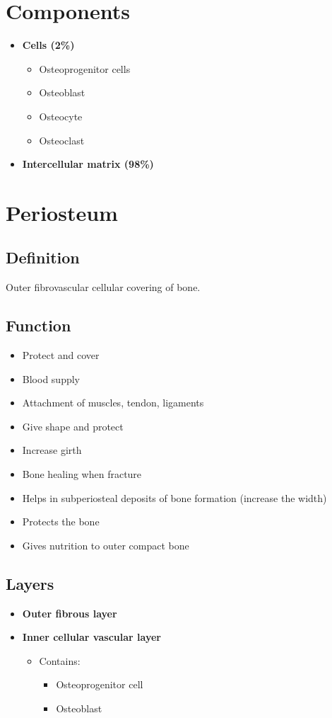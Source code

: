 \documentclass[11pt]{article}
\begin{document}
\section{Components}
\begin{itemize}
    \item \textbf{Cells (2\%)}
    \begin{itemize}
        \item Osteoprogenitor cells
        \item Osteoblast
        \item Osteocyte
        \item Osteoclast
    \end{itemize}
    \item \textbf{Intercellular matrix (98\%)}
\end{itemize}

\section{Periosteum}
\subsection{Definition}
Outer fibrovascular cellular covering of bone.

\subsection{Function}
\begin{itemize}
    \item Protect and cover
    \item Blood supply
    \item Attachment of muscles, tendon, ligaments
    \item Give shape and protect
    \item Increase girth
    \item Bone healing when fracture
    \item Helps in subperiosteal deposits of bone formation (increase the width)
    \item Protects the bone
    \item Gives nutrition to outer compact bone
\end{itemize}

\subsection{Layers}
\begin{itemize}
    \item \textbf{Outer fibrous layer}
    \item \textbf{Inner cellular vascular layer}
    \begin{itemize}
        \item Contains:
        \begin{itemize}
            \item Osteoprogenitor cell
            \item Osteoblast
        \end{itemize}
    \end{itemize}
\end{itemize}
\end{document}
